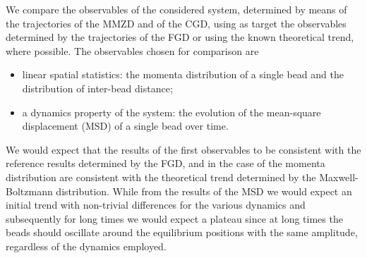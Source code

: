 \documentclass[10pt,a4paper]{book}
\theoremstyle{definition}
\begin{document}
We compare the observables of the considered system, determined by means of the trajectories of the MMZD and of the CGD, using as target the observables determined by the trajectories of the FGD or using the known theoretical trend, where possible. 
The observables chosen for comparison are
\begin{itemize}
\item[-] linear spatial statistics: the momenta distribution of a single bead and the distribution of inter-bead distance;
\item[-] a dynamics property of the system: the evolution of the mean-square displacement (MSD) of a single bead over time.
\end{itemize}
We would expect that the results of the first observables to be consistent with the reference results determined by the FGD, and in the case of the momenta distribution are consistent with the theoretical trend determined by the Maxwell-Boltzmann distribution. 
While from the results of the MSD we would expect an initial trend with non-trivial differences for the various dynamics and subsequently for long times we would expect a plateau since at long times the beads should oscillate around the equilibrium positions with the same amplitude, regardless of the dynamics employed.
\end{document}
